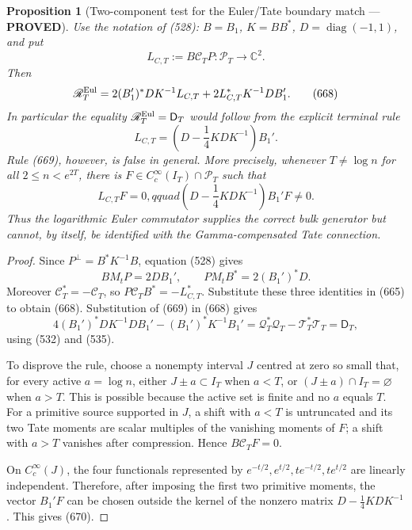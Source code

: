 \documentclass[11pt]{article}
\newtheorem{proposition}[theorem]{Proposition}
\newcommand{\PROVED}{\textcolor{green!45!black}{\textbf{PROVED}}}
\begin{document}
\begin{proposition}[Two-component test for the Euler/Tate boundary match ---
\PROVED]
Use the notation of (528):
\(B=B_1\), \(K=BB^*\),
\(D=\operatorname{diag}(-1,1)\), and put
\begin{equation}
 L_{C,T}:=B\mathscr C_TP:
 \mathcal P_T\longrightarrow\mathbb C^2.            \tag{667}
\end{equation}
Then
\begin{equation}
 \mathscr R_T^{\rm Eul}
 =2(B_1')^*DK^{-1}L_{C,T}
  +2L_{C,T}^*K^{-1}DB_1'.                           \tag{668}
\end{equation}
In particular the equality
\(\mathscr R_T^{\rm Eul}=\mathsf D_T\) would follow from the explicit
terminal rule
\begin{equation}
 \boxed{
 L_{C,T}=\left(D-\frac14KDK^{-1}\right)B_1'.}       \tag{669}
\end{equation}
Rule (669), however, is false in general.  More precisely, whenever
\(T\ne\log n\) for all \(2\le n<e^{2T}\), there is
\(F\in C_c^\infty(I_T)\cap\mathcal P_T\) such that
\begin{equation}
 L_{C,T}F=0,qquad
 \left(D-\frac14KDK^{-1}\right)B_1'F\ne0.           \tag{670}
\end{equation}
Thus the logarithmic Euler commutator supplies the correct bulk generator
but cannot, by itself, be identified with the Gamma-compensated Tate
connection.
\end{proposition}

\begin{proof}
Since \(P^\perp=B^*K^{-1}B\), equation (528) gives
\[
 BM_tP=2DB_1',\qquad PM_tB^*=2(B_1')^*D.
\]
Moreover \(\mathscr C_T^*=-\mathscr C_T\), so
\(P\mathscr C_TB^*=-L_{C,T}^*\).  Substitute these three identities in
(665) to obtain (668).  Substitution of (669) in (668) gives
\[
 4(B_1')^*DK^{-1}DB_1'-(B_1')^*K^{-1}B_1'
 =\mathcal Q_T^*\mathcal Q_T-
   \mathcal T_T^*\mathcal T_T=\mathsf D_T,
\]
using (532) and (535).

To disprove the rule, choose a nonempty interval \(J\) centred at zero so
small that, for every active \(a=\log n\), either
\(J\pm a\subset I_T\) when \(a<T\), or
\((J\pm a)\cap I_T=\varnothing\) when \(a>T\).  This is possible because
the active set is finite and no \(a\) equals \(T\).  For a primitive source
supported in \(J\), a shift with \(a<T\) is untruncated and its two Tate
moments are scalar multiples of the vanishing moments of \(F\); a shift
with \(a>T\) vanishes after compression.  Hence
\(B\mathscr C_TF=0\).

On \(C_c^\infty(J)\), the four functionals represented by
\(e^{-t/2},e^{t/2},te^{-t/2},te^{t/2}\) are linearly independent.
Therefore, after imposing the first two primitive moments, the vector
\(B_1'F\) can be chosen outside the kernel of the nonzero matrix
\(D-\frac14KDK^{-1}\).  This gives (670).
\end{proof}
\end{document}
